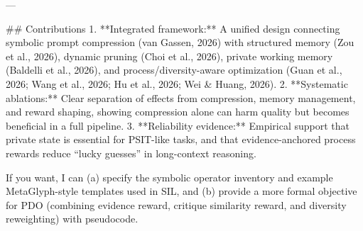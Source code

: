 ---

## Contributions  
1. **Integrated framework:** A unified design connecting symbolic prompt compression (van Gassen, 2026) with structured memory (Zou et al., 2026), dynamic pruning (Choi et al., 2026), private working memory (Baldelli et al., 2026), and process/diversity-aware optimization (Guan et al., 2026; Wang et al., 2026; Hu et al., 2026; Wei & Huang, 2026).  
2. **Systematic ablations:** Clear separation of effects from compression, memory management, and reward shaping, showing compression alone can harm quality but becomes beneficial in a full pipeline.  
3. **Reliability evidence:** Empirical support that private state is essential for PSIT-like tasks, and that evidence-anchored process rewards reduce “lucky guesses” in long-context reasoning.

If you want, I can (a) specify the symbolic operator inventory and example MetaGlyph-style templates used in SIL, and (b) provide a more formal objective for PDO (combining evidence reward, critique similarity reward, and diversity reweighting) with pseudocode.